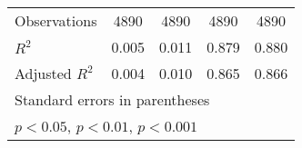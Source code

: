 {\begin{tabular}{l*{4}{c}}
\hline
Observations        &        4890         &        4890         &        4890         &        4890         \\
\(R^{2}\)           &       0.005         &       0.011         &       0.879         &       0.880         \\
Adjusted \(R^{2}\)  &       0.004         &       0.010         &       0.865         &       0.866         \\
\hline\hline
\multicolumn{5}{l}{\footnotesize Standard errors in parentheses}\\
\multicolumn{5}{l}{\footnotesize \sym{*} \(p<0.05\), \sym{**} \(p<0.01\), \sym{***} \(p<0.001\)}\\
\end{tabular}
}
